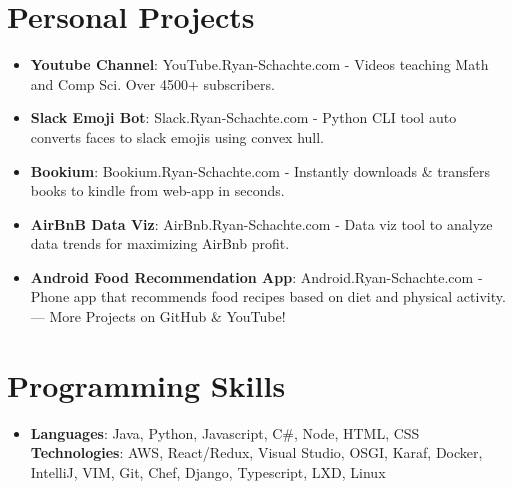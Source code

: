 \documentclass[letterpaper,11pt]{article}
\newcommand{\resumeItem}[2]{
  \item\small{
    \textbf{#1}{: #2 \vspace{-2pt}}
  }
}
\newcommand{\resumeSubItem}[2]{\resumeItem{#1}{#2}\vspace{-4pt}}
\newcommand{\resumeSubHeadingListStart}{\begin{itemize}[leftmargin=*]}
\newcommand{\resumeSubHeadingListEnd}{\end{itemize}}
\begin{document}
\section{Personal Projects}
  \resumeSubHeadingListStart
    \resumeSubItem{Youtube Channel}
      {YouTube.Ryan-Schachte.com - Videos teaching Math and Comp Sci. Over 4500+ subscribers.}
    \resumeSubItem{Slack Emoji Bot}
      {Slack.Ryan-Schachte.com - Python CLI tool auto converts faces to slack emojis using convex hull.}
    \resumeSubItem{Bookium}
      {Bookium.Ryan-Schachte.com - Instantly downloads & transfers books to kindle from web-app in seconds.}
    \resumeSubItem{AirBnB Data Viz}
      {AirBnb.Ryan-Schachte.com - Data viz tool to analyze data trends for maximizing AirBnb profit.}
    \resumeSubItem{Android Food Recommendation App}
      {Android.Ryan-Schachte.com - Phone app that recommends food recipes
based on diet and physical activity. — More Projects on GitHub & YouTube!}
  \resumeSubHeadingListEnd

%
\section{Programming Skills}
 \resumeSubHeadingListStart
    \item{
     \textbf{Languages}{: Java, Python, Javascript, C\#, Node, HTML, CSS}
     \hfill
     \textbf{Technologies}{: AWS, React/Redux, Visual Studio, OSGI, Karaf, Docker, IntelliJ, VIM, Git, Chef, Django, Typescript, LXD, Linux}
    }
 \resumeSubHeadingListEnd


\end{document}
